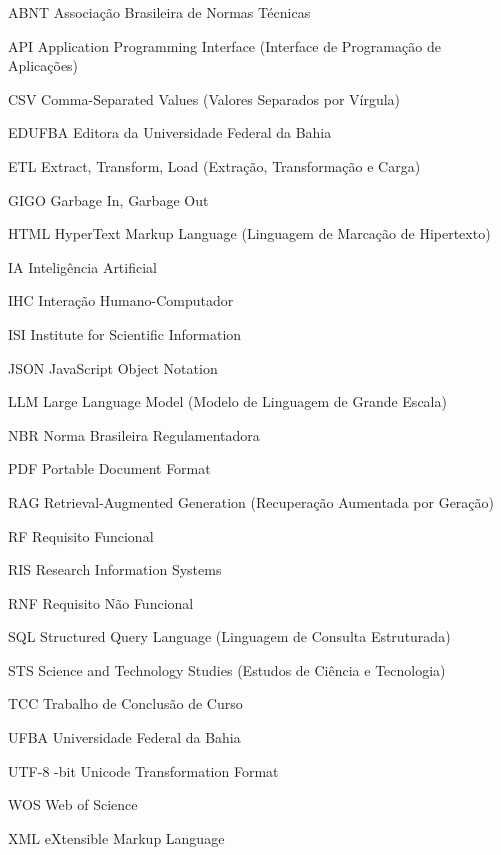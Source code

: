 \documentclass[
	oneside,
	a4paper,
	12pt,
	chapter=TITLE,
	section=TITLE,
	english,
	brazilian
]{abntex2}
\begin{document}
\listoffigures*
\cleardoublepage


\listoftables*
\cleardoublepage


\begin{siglas}

  \item[ABNT]\quad Associação Brasileira de Normas Técnicas
  \item[API]\quad Application Programming Interface (Interface de Programação de Aplicações)
  \item[CSV]\quad Comma-Separated Values (Valores Separados por Vírgula)
  \item[EDUFBA]\quad Editora da Universidade Federal da Bahia
  \item[ETL]\quad Extract, Transform, Load (Extração, Transformação e Carga)
  \item[GIGO]\quad Garbage In, Garbage Out
  \item[HTML]\quad HyperText Markup Language (Linguagem de Marcação de Hipertexto)
  \item[IA]\quad Inteligência Artificial
  \item[IHC]\quad Interação Humano-Computador
  \item[ISI]\quad Institute for Scientific Information
  \item[JSON]\quad JavaScript Object Notation
  \item[LLM]\quad Large Language Model (Modelo de Linguagem de Grande Escala)
  \item[NBR]\quad Norma Brasileira Regulamentadora
  \item[PDF]\quad Portable Document Format
  \item[RAG]\quad Retrieval-Augmented Generation (Recuperação Aumentada por Geração)
  \item[RF]\quad Requisito Funcional
  \item[RIS]\quad Research Information Systems
  \item[RNF]\quad Requisito Não Funcional
  \item[SQL]\quad Structured Query Language (Linguagem de Consulta Estruturada)
  \item[STS]\quad Science and Technology Studies (Estudos de Ciência e Tecnologia)
  \item[TCC]\quad Trabalho de Conclusão de Curso
  \item[UFBA]\quad Universidade Federal da Bahia
  \item[UTF-8]-bit Unicode Transformation Format
  \item[WOS]\quad Web of Science
  \item[XML]\quad eXtensible Markup Language
\end{siglas}
\cleardoublepage
\end{document}
